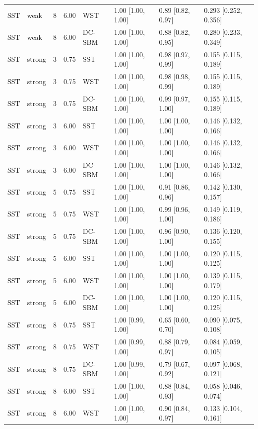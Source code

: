 \begin{table}
\begin{tabular}[t]{llrrllll}
SST & weak & 8 & 6.00 & WST & 1.00 [1.00, 1.00] & 0.89 [0.82, 0.97] & 0.293 [0.252, 0.356]\\
SST & weak & 8 & 6.00 & DC-SBM & 1.00 [1.00, 1.00] & 0.88 [0.82, 0.95] & 0.280 [0.233, 0.349]\\
SST & strong & 3 & 0.75 & SST & 1.00 [1.00, 1.00] & 0.98 [0.97, 0.99] & 0.155 [0.115, 0.189]\\
SST & strong & 3 & 0.75 & WST & 1.00 [1.00, 1.00] & 0.98 [0.98, 0.99] & 0.155 [0.115, 0.189]\\
\addlinespace
SST & strong & 3 & 0.75 & DC-SBM & 1.00 [1.00, 1.00] & 0.99 [0.97, 1.00] & 0.155 [0.115, 0.189]\\
SST & strong & 3 & 6.00 & SST & 1.00 [1.00, 1.00] & 1.00 [1.00, 1.00] & 0.146 [0.132, 0.166]\\
SST & strong & 3 & 6.00 & WST & 1.00 [1.00, 1.00] & 1.00 [1.00, 1.00] & 0.146 [0.132, 0.166]\\
SST & strong & 3 & 6.00 & DC-SBM & 1.00 [1.00, 1.00] & 1.00 [1.00, 1.00] & 0.146 [0.132, 0.166]\\
SST & strong & 5 & 0.75 & SST & 1.00 [1.00, 1.00] & 0.91 [0.86, 0.96] & 0.142 [0.130, 0.157]\\
\addlinespace
SST & strong & 5 & 0.75 & WST & 1.00 [1.00, 1.00] & 0.99 [0.96, 1.00] & 0.149 [0.119, 0.186]\\
SST & strong & 5 & 0.75 & DC-SBM & 1.00 [1.00, 1.00] & 0.96 [0.90, 1.00] & 0.136 [0.120, 0.155]\\
SST & strong & 5 & 6.00 & SST & 1.00 [1.00, 1.00] & 1.00 [1.00, 1.00] & 0.120 [0.115, 0.125]\\
SST & strong & 5 & 6.00 & WST & 1.00 [1.00, 1.00] & 1.00 [1.00, 1.00] & 0.139 [0.115, 0.179]\\
SST & strong & 5 & 6.00 & DC-SBM & 1.00 [1.00, 1.00] & 1.00 [1.00, 1.00] & 0.120 [0.115, 0.125]\\
\addlinespace
SST & strong & 8 & 0.75 & SST & 1.00 [0.99, 1.00] & 0.65 [0.60, 0.70] & 0.090 [0.075, 0.108]\\
SST & strong & 8 & 0.75 & WST & 1.00 [0.99, 1.00] & 0.88 [0.79, 0.97] & 0.084 [0.059, 0.105]\\
SST & strong & 8 & 0.75 & DC-SBM & 1.00 [0.99, 1.00] & 0.79 [0.67, 0.92] & 0.097 [0.068, 0.121]\\
SST & strong & 8 & 6.00 & SST & 1.00 [1.00, 1.00] & 0.88 [0.84, 0.93] & 0.058 [0.046, 0.074]\\
SST & strong & 8 & 6.00 & WST & 1.00 [1.00, 1.00] & 0.90 [0.84, 0.97] & 0.133 [0.104, 0.161]\\

\end{tabular}
\end{table}

